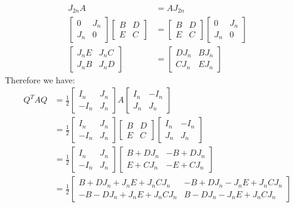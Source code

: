 \begin{align*}
    J_{2n}A&=AJ_{2n}\\
    \begin{bmatrix}
        0 & J_n\\
        J_n & 0
    \end{bmatrix}
    \begin{bmatrix}
        B & D\\
        E & C
    \end{bmatrix}
    &=\begin{bmatrix}
        B & D\\
        E & C
    \end{bmatrix}
    \begin{bmatrix}
        0 & J_n\\
        J_n & 0
    \end{bmatrix}\\
    \begin{bmatrix}
        J_nE & J_nC\\
        J_nB & J_nD
    \end{bmatrix}&=\begin{bmatrix}
        DJ_n & BJ_n\\
        CJ_n & EJ_n
    \end{bmatrix}
\end{align*}
Therefore we have:
\begin{align*}
    Q^TAQ&=\frac{1}{2} \begin{bmatrix}
        I_n & J_n\\
        -I_n & J_n
    \end{bmatrix} A \begin{bmatrix}
        I_n & -I_n\\
        J_n & J_n
    \end{bmatrix}\\
    &=\frac{1}{2} \begin{bmatrix}
        I_n & J_n\\
        -I_n & J_n
    \end{bmatrix} \begin{bmatrix}
        B & D\\
        E & C
    \end{bmatrix} \begin{bmatrix}
        I_n & -I_n\\
        J_n & J_n
    \end{bmatrix}\\
    &=\frac{1}{2} \begin{bmatrix}
        I_n & J_n\\
        -I_n & J_n
    \end{bmatrix} \begin{bmatrix}
        B+DJ_n & -B+DJ_n\\
        E+CJ_n & -E+CJ_n
    \end{bmatrix}\\
    &=\frac{1}{2} \begin{bmatrix}
        B+DJ_n+J_nE+J_nCJ_n & -B+DJ_n-J_nE+J_nCJ_n\\
        -B-DJ_n+J_nE+J_nCJ_n & B-DJ_n-J_nE+J_nCJ_n
    \end{bmatrix}
\end{align*}
